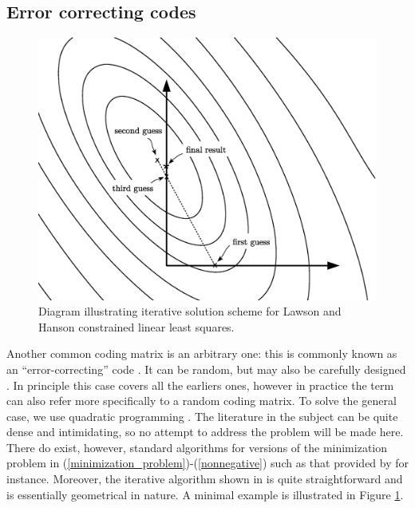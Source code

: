 \subsection{Error correcting codes}

\begin{figure}
  \includegraphics[width=1\textwidth]{Lawson_Hanson}
	\caption{Diagram illustrating iterative solution scheme for Lawson and Hanson constrained linear least squares.}\label{Lawson_Hanson_fig}
\end{figure}

Another common coding matrix is an arbitrary one: this is commonly
known as an ``error-correcting'' code \citep{Dietterich_Bakiri1995}.
It can be random, but may also be carefully designed 
\citep{Crammer_Singer2002,Zhou_etal2008,Zhong_Cheriet2013,Rocha_Goldenstein2014}.
In principle this case covers all the earliers ones, however in practice the
term can also refer more specifically to a random coding matrix.
To solve the general case, we use quadratic programming \citet{Boyd_Vandenberghe2004}.
The literature in the subject can be quite dense and intimidating, so
no attempt to address the problem will be made here. 
There do exist, however, standard algorithms
for versions of the minimization problem in 
(\ref{minimization_problem})-(\ref{nonnegative})
such as that provided by 
\citet{Lawson_Hanson1995} for instance. 
Moreover, the iterative algorithm shown in \citet{Lawson_Hanson1995}
is quite straightforward and is essentially geometrical in nature.
A minimal example is illustrated in Figure \ref{Lawson_Hanson_fig}.

